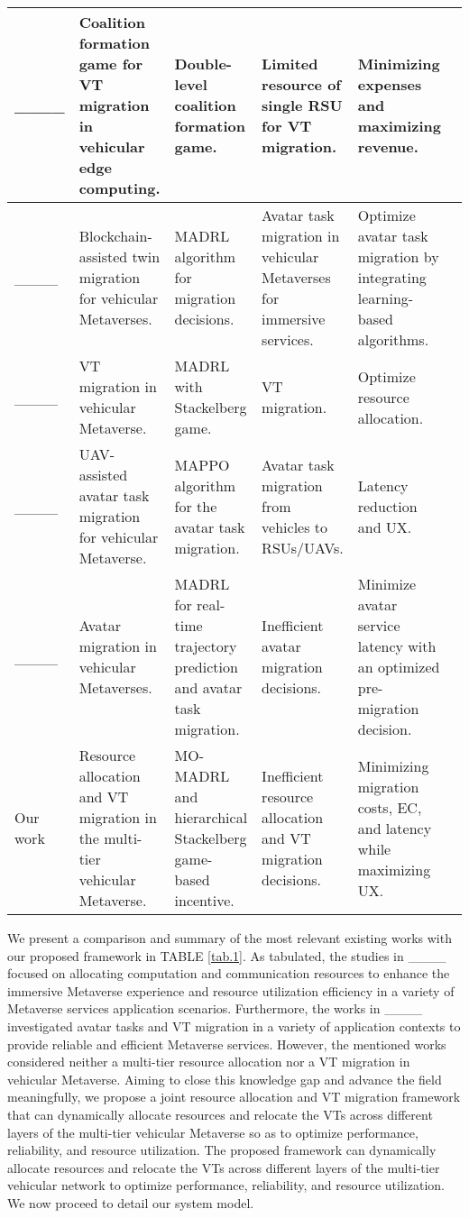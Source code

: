 \begin{table*}[http]
\begin{tabular}{|p{0.8cm}| p{3.9cm}| p{3.6cm}| p{3.5cm}| p{3.8cm}| p{4.5cm}| }
  ____ & Coalition formation game for VT migration in vehicular edge computing. & Double-level coalition formation game. & Limited resource of single RSU for VT migration.& Minimizing expenses and maximizing revenue.\\
		\hline
  ____ & Blockchain-assisted twin migration for vehicular Metaverses.
 &MADRL algorithm for migration decisions. & Avatar task migration in vehicular Metaverses for immersive services.& Optimize avatar task migration by integrating learning-based algorithms.
\\
		\hline
  ____ & VT migration in vehicular Metaverse. &MADRL with Stackelberg game. & VT migration.&  Optimize resource allocation.\\
		\hline
 ____ & UAV-assisted avatar task migration for vehicular Metaverse. &MAPPO algorithm for the avatar task migration.& Avatar task migration from vehicles to RSUs/UAVs. & 
Latency reduction and UX. 
\\
		\hline
  ____ & Avatar migration in vehicular Metaverses.& MADRL  for real-time trajectory prediction and avatar task migration. & Inefficient avatar migration decisions. & Minimize avatar service latency with an optimized pre-migration decision. 
\\
		\hline
Our work & Resource allocation and VT migration in the multi-tier vehicular Metaverse.&MO-MADRL and hierarchical Stackelberg game-based incentive. & Inefficient resource allocation and VT migration decisions.  & Minimizing migration costs, EC, and latency while maximizing UX.
\\
		\hline
	\end{tabular}
\end{table*}

We present a comparison and summary of the most relevant existing works with our proposed framework in TABLE \ref{tab.1}. As tabulated, the studies in ____ focused on allocating computation and communication resources to enhance the immersive Metaverse experience and resource utilization efficiency in a variety of Metaverse services application scenarios. Furthermore, the works in ____ investigated avatar tasks and VT migration in a variety of application contexts to provide reliable and efficient Metaverse services. However, the mentioned works considered neither a multi-tier resource allocation nor a VT migration in vehicular Metaverse. Aiming to close this knowledge gap and advance the field meaningfully, we propose a joint resource allocation and VT migration framework that can dynamically allocate resources and relocate the VTs across different layers of the multi-tier vehicular Metaverse so as to optimize performance, reliability, and resource utilization. The proposed framework can dynamically allocate resources and relocate the VTs across different layers of the multi-tier vehicular network to optimize performance, reliability, and resource utilization. \newline 
We now proceed to detail our system model.
